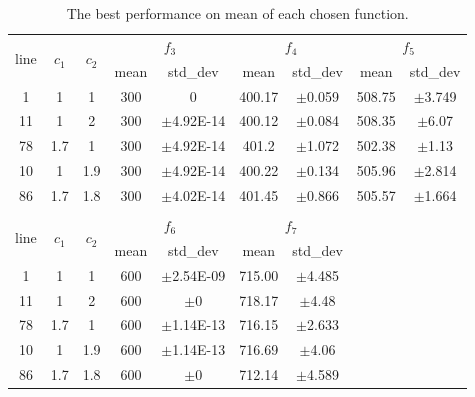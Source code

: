 \documentclass[letterpaper,12pt]{article}
\begin{document}
\begin{table}[!htb]
\centering
\begin{tabular}{|c|c|c|c|c|c|c|c|c|}
\hline
\multirow{2}{*}{line} & \multirow{2}{*}{$c_1$} & \multirow{2}{*}{$c_2$} & \multicolumn{2}{c|}{$f_3$} & \multicolumn{2}{c|}{$f_4$} & \multicolumn{2}{c|}{$f_5$} \\ \cline{4-9} 
   &     &     & mean & std\_dev      & mean   & std\_dev   & mean   & std\_dev   \\ \hline
1  & 1   & 1   & 300  & 0             & 400.17 & $\pm$0.059 & 508.75 & $\pm$3.749 \\ \hline
11 & 1   & 2   & 300  & $\pm$4.92E-14 & 400.12 & $\pm$0.084 & 508.35 & $\pm$6.07  \\ \hline
78 & 1.7 & 1   & 300  & $\pm$4.92E-14 & 401.2  & $\pm$1.072 & 502.38 & $\pm$1.13  \\ \hline
10 & 1   & 1.9 & 300  & $\pm$4.92E-14 & 400.22 & $\pm$0.134 & 505.96 & $\pm$2.814 \\ \hline
86 & 1.7 & 1.8 & 300  & $\pm$4.02E-14 & 401.45 & $\pm$0.866 & 505.57 & $\pm$1.664 \\ \hline
   &     &     &      &               &        &            &        &            \\ \hline
\multirow{2}{*}{line} & \multirow{2}{*}{$c_1$} & \multirow{2}{*}{$c_2$} & \multicolumn{2}{c|}{$f_6$} & \multicolumn{2}{c|}{$f_7$} &              &             \\ \cline{4-9} 
   &     &     & mean & std\_dev      & mean   & std\_dev   &        &            \\ \hline
1  & 1   & 1   & 600  & $\pm$2.54E-09 & 715.00 & $\pm$4.485 &        &            \\ \hline
11 & 1   & 2   & 600  & $\pm$0        & 718.17 & $\pm$4.48  &        &            \\ \hline
78 & 1.7 & 1   & 600  & $\pm$1.14E-13 & 716.15 & $\pm$2.633 &        &            \\ \hline
10 & 1   & 1.9 & 600  & $\pm$1.14E-13 & 716.69 & $\pm$4.06  &        &            \\ \hline
86 & 1.7 & 1.8 & 600  & $\pm$0        & 712.14 & $\pm$4.589 &        &            \\ \hline
\end{tabular}
\caption {The best performance on mean of each chosen function.}
\label{tab:PSO_c_mean}
\end{table}
\end{document}
